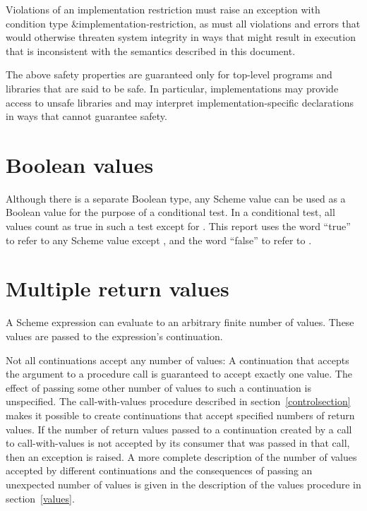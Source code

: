 Violations of an implementation restriction must raise an
exception with condition type {\cf\&implementation-restriction},
as must all
violations and errors that would otherwise threaten system
integrity in ways that might result in execution that is
inconsistent with the semantics described in this document.

The above safety properties are guaranteed only for top-level programs
and libraries that are said to be safe.  In particular, implementations
may provide access to unsafe libraries and may interpret
implementation-specific declarations in ways that
cannot guarantee safety.

\section{Boolean values}
\label{booleanvaluessection}

Although there is a separate Boolean type, any Scheme value can be
used as a Boolean value for the purpose of a conditional test.  In a
conditional test, all values count as true in such a test except for
\schfalse{}.  This report uses the word ``true'' to refer to any
Scheme value except \schfalse{}, and the word ``false'' to refer to
\schfalse{}.  

\section{Multiple return values}
\label{multiplereturnvaluessection}

A Scheme expression can evaluate to an arbitrary finite number of
values.  These values are passed to the expression's continuation.

Not all continuations accept any number of values: A continuation that
accepts the argument to a procedure call is guaranteed to accept
exactly one value.  The effect of passing some other number of values
to such a continuation is unspecified.  The {\cf call-with-values}
procedure
described in section~\ref{controlsection} makes it possible to create
continuations that accept specified numbers of return values.
If the number of
return values passed to a continuation created by a call to
{\cf call-with-values} is not accepted by its consumer
that was passed in that call, then an exception is raised.
A more complete description of the number of values accepted by
different continuations and the consequences of passing an unexpected
number of values is given in the description of the {\cf values}
procedure in section~\ref{values}.

